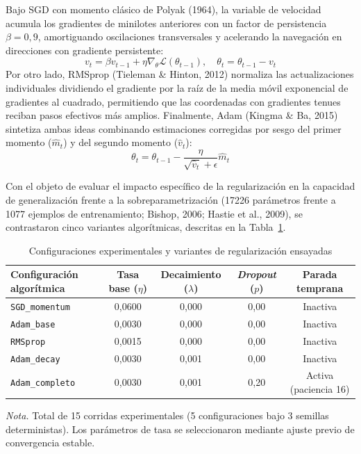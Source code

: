 \documentclass[12pt,letterpaper]{article}
\newcommand{\nota}[1]{\par\noindent\small\textit{Nota.} #1\par\normalsize}
\begin{document}
Bajo SGD con momento clásico de Polyak (1964), la variable de velocidad acumula los gradientes de minilotes anteriores con un factor de persistencia $\beta = 0{,}9$, amortiguando oscilaciones transversales y acelerando la navegación en direcciones con gradiente persistente:
\begin{equation}
v_t = \beta v_{t-1} + \eta \nabla_\theta \mathcal{L}(\theta_{t-1}), \quad \theta_t = \theta_{t-1} - v_t
\end{equation}
Por otro lado, RMSprop (Tieleman \& Hinton, 2012) normaliza las actualizaciones individuales dividiendo el gradiente por la raíz de la media móvil exponencial de gradientes al cuadrado, permitiendo que las coordenadas con gradientes tenues reciban pasos efectivos más amplios. Finalmente, Adam (Kingma \& Ba, 2015) sintetiza ambas ideas combinando estimaciones corregidas por sesgo del primer momento ($\hat{m}_t$) y del segundo momento ($\hat{v}_t$):
\begin{equation}
\theta_t = \theta_{t-1} - \frac{\eta}{\sqrt{\hat{v}_t} + \epsilon} \hat{m}_t
\end{equation}

Con el objeto de evaluar el impacto específico de la regularización en la capacidad de generalización frente a la sobreparametrización (17226 parámetros frente a 1077 ejemplos de entrenamiento; Bishop, 2006; Hastie et al., 2009), se contrastaron cinco variantes algorítmicas, descritas en la Tabla~\ref{tab:config}.

\begin{table}[H]\caption{Configuraciones experimentales y variantes de regularización ensayadas}\label{tab:config}
\begin{singlespace}\small\centering\begin{tabularx}{\textwidth}{lcccc}\toprule
Configuración algorítmica & Tasa base ($\eta$) & Decaimiento ($\lambda$) & \textit{Dropout} ($p$) & Parada temprana \\\midrule
\texttt{SGD\_momentum} & 0,0600 & 0,000 & 0,00 & Inactiva \\
\texttt{Adam\_base} & 0,0030 & 0,000 & 0,00 & Inactiva \\
\texttt{RMSprop} & 0,0015 & 0,000 & 0,00 & Inactiva \\
\texttt{Adam\_decay} & 0,0030 & 0,001 & 0,00 & Inactiva \\
\texttt{Adam\_completo} & 0,0030 & 0,001 & 0,20 & Activa (paciencia 16) \\\bottomrule
\end{tabularx}\end{singlespace}\nota{Total de 15 corridas experimentales (5 configuraciones bajo 3 semillas deterministas). Los parámetros de tasa se seleccionaron mediante ajuste previo de convergencia estable.}\end{table}
\end{document}
